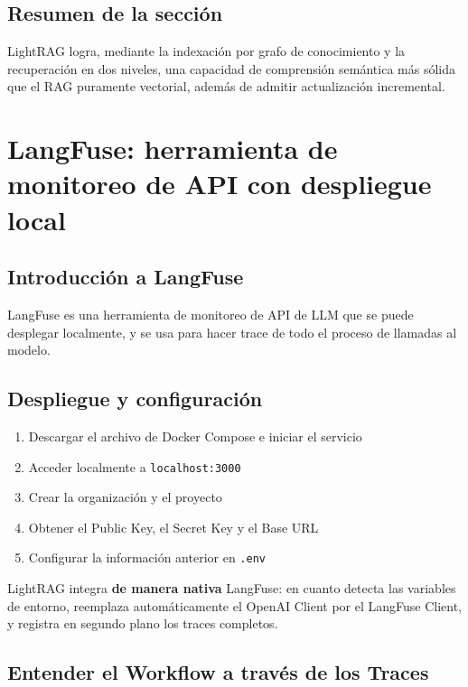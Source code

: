 \documentclass[a4paper]{article}
\begin{document}
\subsection{Resumen de la sección}

LightRAG logra, mediante la indexación por grafo de conocimiento y la recuperación en dos niveles, una capacidad de comprensión semántica más sólida que el RAG puramente vectorial, además de admitir actualización incremental.

\section{LangFuse: herramienta de monitoreo de API con despliegue local}

\subsection{Introducción a LangFuse}

LangFuse es una herramienta de monitoreo de API de LLM que se puede desplegar localmente, y se usa para hacer trace de todo el proceso de llamadas al modelo.

\subsection{Despliegue y configuración}

\begin{enumerate}
    \item Descargar el archivo de Docker Compose e iniciar el servicio
    \item Acceder localmente a \texttt{localhost:3000}
    \item Crear la organización y el proyecto
    \item Obtener el Public Key, el Secret Key y el Base URL
    \item Configurar la información anterior en \texttt{.env}
\end{enumerate}

LightRAG integra \textbf{de manera nativa} LangFuse: en cuanto detecta las variables de entorno, reemplaza automáticamente el OpenAI Client por el LangFuse Client, y registra en segundo plano los traces completos.

\subsection{Entender el Workflow a través de los Traces}
\end{document}
